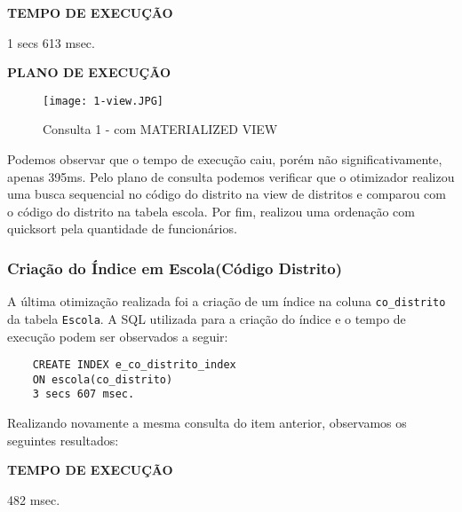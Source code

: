 \documentclass[12pt,a4paper]{article}
\begin{document}
\vspace{0.01cm}
\begin{flushleft}
\textbf{TEMPO DE EXECUÇÃO}\\
\end{flushleft}
1 secs 613 msec.\\

\begin{flushleft}
\textbf{PLANO DE EXECUÇÃO}\\
\end{flushleft}

\begin{figure}[H]
    \centering
    \texttt{[image: 1-view.JPG]}
    \caption{Consulta 1 - com MATERIALIZED VIEW}
    \label{fig:diagrama}
\end{figure}

Podemos observar que o tempo de execução caiu, porém não significativamente, apenas 395ms. Pelo plano de consulta podemos verificar que o otimizador realizou uma busca sequencial no código do distrito na view de distritos e comparou com o código do distrito na tabela escola. Por fim, realizou uma ordenação com quicksort pela quantidade de funcionários.


\subsubsection{Criação do Índice em Escola(Código Distrito)}

A última otimização realizada foi a criação de um índice na coluna \texttt{co\_distrito} da tabela \texttt{Escola}. A SQL utilizada para a criação do índice e o tempo de execução podem ser observados a seguir:

\vspace{0.25cm}
\begin{verbatim}
    CREATE INDEX e_co_distrito_index 
    ON escola(co_distrito)
    3 secs 607 msec.
\end{verbatim}
\vspace{0.25cm}

Realizando novamente a mesma consulta do item anterior, observamos os seguintes resultados:

\vspace{0.01cm}
\begin{flushleft}
\textbf{TEMPO DE EXECUÇÃO}\\
\end{flushleft}
482 msec.\\
\end{document}
